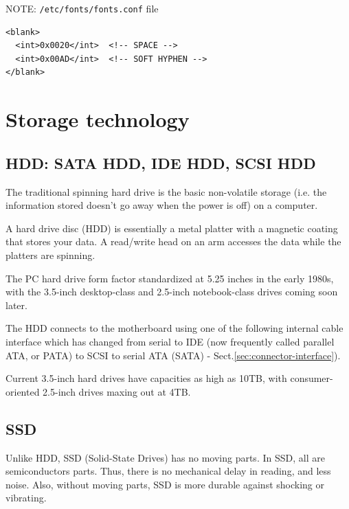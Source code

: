 NOTE: \verb!/etc/fonts/fonts.conf! file
\begin{verbatim}
<blank>
  <int>0x0020</int>  <!-- SPACE -->
  <int>0x00AD</int>  <!-- SOFT HYPHEN -->
</blank>
\end{verbatim}

\section{Storage technology}

\subsection{HDD: SATA HDD, IDE HDD, SCSI HDD}

The traditional spinning hard drive is the basic non-volatile storage (i.e.
the information stored doesn't go away when the power is off) on a computer.

A hard drive disc (HDD) is essentially a metal platter with a magnetic coating
that stores your data. A read/write head on an arm accesses the data while the
platters are spinning.

The PC hard drive form factor standardized at 5.25 inches in the early 1980s,
with the 3.5-inch desktop-class and 2.5-inch notebook-class drives coming soon
later.

The HDD connects to the motherboard using one of the following internal cable
interface which has changed from serial to IDE (now frequently called parallel
ATA, or PATA) to SCSI to serial ATA (SATA) -
Sect.\ref{sec:connector-interface}).

Current 3.5-inch hard drives have capacities as high as 10TB, with
consumer-oriented 2.5-inch drives maxing out at 4TB.

\subsection{SSD}
\label{sec:SSD}

Unlike HDD, SSD (Solid-State Drives) has no moving parts. In SSD, all are
semiconductors parts. Thus, there is no mechanical delay in reading, and less
noise. Also, without moving parts, SSD is more durable against shocking or
vibrating.

